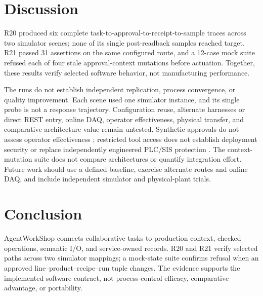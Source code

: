\section{Discussion}
\label{sec:limits}
R20 produced six complete task-to-approval-to-receipt-to-sample traces across
two simulator scenes; none of its single post-readback samples reached target.
R21 passed 31 assertions on the same configured route, and a 12-case mock
suite refused each of four stale approval-context mutations before actuation.
Together, these results verify selected software behavior, not manufacturing
performance.

The runs do not establish independent replication, process convergence, or
quality improvement. Each scene used one simulator instance, and its single
probe is not a response trajectory. Configuration reuse, alternate harnesses
or direct REST entry, online DAQ, operator effectiveness, physical transfer,
and comparative architecture value remain untested. Synthetic approvals do
not assess operator effectiveness
\cite{parasuramanmanzey2010complacency,parasuraman2000model,bainbridge1983ironies};
restricted tool access does not establish deployment security
\cite{greshake2023injection,liu2024pinjection,iec62443-3-3} or replace
independently engineered PLC/SIS protection \cite{iec61511}. The
context-mutation suite does not compare architectures or quantify integration
effort. Future work should use a defined baseline, exercise alternate routes
and online DAQ, and include independent simulator and physical-plant trials.

\section{Conclusion}
\label{sec:conclusion}
AgentWorkShop connects collaborative tasks to production context, checked
operations, semantic I/O, and service-owned records. R20 and R21 verify
selected paths across two simulator mappings; a mock-state suite confirms
refusal when an approved line--product--recipe--run tuple changes. The evidence
supports the implemented software contract, not process-control efficacy,
comparative advantage, or portability.
